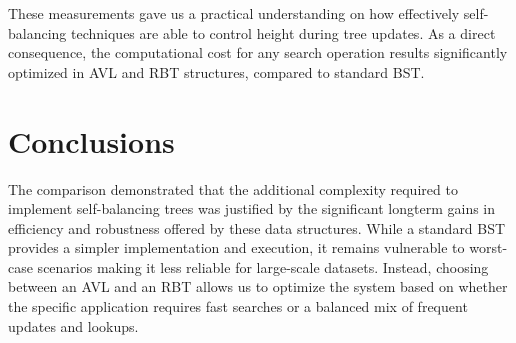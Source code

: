 \documentclass[12pt,a4paper]{article}
\begin{document}
        These measurements gave us a practical understanding on how effectively self-balancing techniques are able to control height during tree updates. As a direct consequence, the computational cost for any search operation results significantly optimized in AVL and RBT structures, compared to standard BST.

    \newpage

    \section{Conclusions}

        The comparison demonstrated that the additional complexity required to implement self-balancing trees was justified by the significant longterm gains in efficiency and robustness offered by these data structures. While a standard BST provides a simpler implementation and execution, it remains vulnerable to worst-case scenarios making it less reliable for large-scale datasets. Instead, choosing between an AVL and an RBT allows us to optimize the system based on whether the specific application requires fast searches or a balanced mix of frequent updates and lookups.

    \printbibliography[title={Bibliography \& Sitography}]
\end{document}
